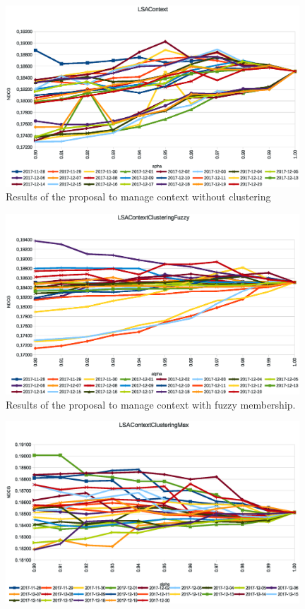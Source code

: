 \documentclass[preprint]{elsarticle}
\begin{document}
\begin{spacing}{1.5}
\begin{figure}[htb]
    \centering
    \includegraphics[width=0.98\textwidth]{figures/ndcg-results-proposal-context-no-clustering.eps}
    \caption{Results of the proposal to manage context without clustering}
    \label{fig:ndcg-results-proposal-context-no-clustering}
\end{figure}
\begin{figure}[htb]
    \centering
    \includegraphics[width=0.98\textwidth]{figures/ndcg-results-proposal-context-fuzzy-clustering-membership.eps}
    \caption{Results of the proposal to manage context with fuzzy membership.}
    \label{fig:ndcg-results-proposal-context-fuzzy-clustering-membership}
\end{figure}
\begin{figure}[htb]
    \centering
    \includegraphics[width=0.98\textwidth]{figures/ndcg-results-proposal-context-fuzzy-clustering-max.eps}

\end{figure}
\end{spacing}
\end{document}
